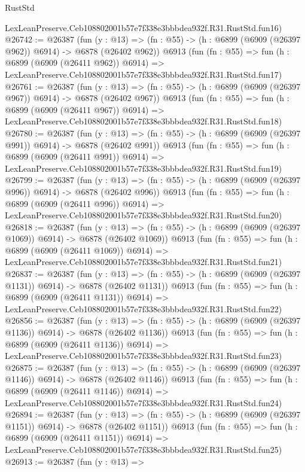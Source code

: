 \begin{lexlean}{RustStd}
\begin{coremodule}
    LexLeanPreserve.Ceb108802001b57e7f338e3bbbdea932f.R31.RustStd.fun16)
@26742 := @26387
    (fun (y : @13) => (fn : @55) -> (h : @6899 (@6909 (@26397 @962)) @6914) -> @6878 (@26402 @962))
    @6913
    (fun (fn : @55) =>
    fun (h : @6899 (@6909 (@26411 @962)) @6914) =>
    LexLeanPreserve.Ceb108802001b57e7f338e3bbbdea932f.R31.RustStd.fun17)
@26761 := @26387
    (fun (y : @13) => (fn : @55) -> (h : @6899 (@6909 (@26397 @967)) @6914) -> @6878 (@26402 @967))
    @6913
    (fun (fn : @55) =>
    fun (h : @6899 (@6909 (@26411 @967)) @6914) =>
    LexLeanPreserve.Ceb108802001b57e7f338e3bbbdea932f.R31.RustStd.fun18)
@26780 := @26387
    (fun (y : @13) => (fn : @55) -> (h : @6899 (@6909 (@26397 @991)) @6914) -> @6878 (@26402 @991))
    @6913
    (fun (fn : @55) =>
    fun (h : @6899 (@6909 (@26411 @991)) @6914) =>
    LexLeanPreserve.Ceb108802001b57e7f338e3bbbdea932f.R31.RustStd.fun19)
@26799 := @26387
    (fun (y : @13) => (fn : @55) -> (h : @6899 (@6909 (@26397 @996)) @6914) -> @6878 (@26402 @996))
    @6913
    (fun (fn : @55) =>
    fun (h : @6899 (@6909 (@26411 @996)) @6914) =>
    LexLeanPreserve.Ceb108802001b57e7f338e3bbbdea932f.R31.RustStd.fun20)
@26818 := @26387
    (fun (y : @13) =>
    (fn : @55) -> (h : @6899 (@6909 (@26397 @1069)) @6914) -> @6878 (@26402 @1069))
    @6913
    (fun (fn : @55) =>
    fun (h : @6899 (@6909 (@26411 @1069)) @6914) =>
    LexLeanPreserve.Ceb108802001b57e7f338e3bbbdea932f.R31.RustStd.fun21)
@26837 := @26387
    (fun (y : @13) =>
    (fn : @55) -> (h : @6899 (@6909 (@26397 @1131)) @6914) -> @6878 (@26402 @1131))
    @6913
    (fun (fn : @55) =>
    fun (h : @6899 (@6909 (@26411 @1131)) @6914) =>
    LexLeanPreserve.Ceb108802001b57e7f338e3bbbdea932f.R31.RustStd.fun22)
@26856 := @26387
    (fun (y : @13) =>
    (fn : @55) -> (h : @6899 (@6909 (@26397 @1136)) @6914) -> @6878 (@26402 @1136))
    @6913
    (fun (fn : @55) =>
    fun (h : @6899 (@6909 (@26411 @1136)) @6914) =>
    LexLeanPreserve.Ceb108802001b57e7f338e3bbbdea932f.R31.RustStd.fun23)
@26875 := @26387
    (fun (y : @13) =>
    (fn : @55) -> (h : @6899 (@6909 (@26397 @1146)) @6914) -> @6878 (@26402 @1146))
    @6913
    (fun (fn : @55) =>
    fun (h : @6899 (@6909 (@26411 @1146)) @6914) =>
    LexLeanPreserve.Ceb108802001b57e7f338e3bbbdea932f.R31.RustStd.fun24)
@26894 := @26387
    (fun (y : @13) =>
    (fn : @55) -> (h : @6899 (@6909 (@26397 @1151)) @6914) -> @6878 (@26402 @1151))
    @6913
    (fun (fn : @55) =>
    fun (h : @6899 (@6909 (@26411 @1151)) @6914) =>
    LexLeanPreserve.Ceb108802001b57e7f338e3bbbdea932f.R31.RustStd.fun25)
@26913 := @26387
    (fun (y : @13) =>

\end{coremodule}
\end{lexlean}

